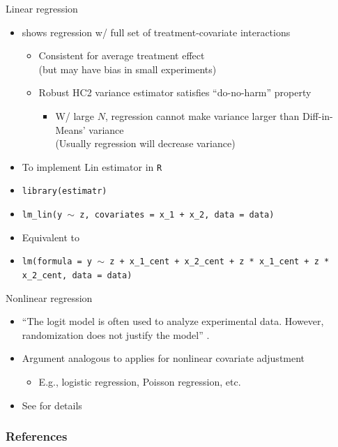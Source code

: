\documentclass[table, xcolor = {dvipsnames}, 9pt]{beamer}
\theoremstyle{plain}
\begin{document}
\begin{frame}{Linear regression} \vfill
\begin{itemize} \vfill
\item \citet{lin2013} shows regression w/ full set of treatment-covariate interactions \vfill
\begin{itemize} \vfill
\item Consistent for average treatment effect \\ (but may have bias in small experiments) \vfill
\item Robust HC2 variance estimator satisfies ``do-no-harm'' property \vfill
\begin{itemize} \vfill
\item W/ large $N$, regression cannot make variance larger than Diff-in-Means' variance \\ (Usually regression will decrease variance) \vfill
\end{itemize} \vfill
\end{itemize} \vfill
\item To implement Lin estimator in \texttt{R} \vfill
\item[] \texttt{library(estimatr)}
\item[]\texttt{lm\_lin(y $\sim$ z, covariates = x\_1 + x\_2, data = data)} \vfill 
\item Equivalent to
\item[] \texttt{lm(formula = y $\sim$ z + x\_1\_cent + x\_2\_cent + z * x\_1\_cent + z * x\_2\_cent, data = data)}
\end{itemize}  
\end{frame}
\begin{frame}{Nonlinear regression} \vfill
\begin{itemize}
\item ``The logit model is often used to analyze experimental data. However, randomization does not justify the model'' \citep[][p.~237]{freedman2008b}. \vfill
\item Argument analogous to \citet{lin2013} applies for nonlinear covariate adjustment \vfill
\begin{itemize} \vfill
\item E.g., logistic regression, Poisson regression, etc. \vfill
\end{itemize} \vfill
\item See \citet{cohenfogarty2023} for details \vfill
\end{itemize}  \vfill
\end{frame}
\begin{frame}[allowframebreaks]
\frametitle{References} 
\scriptsize

\end{frame}
\end{document}
